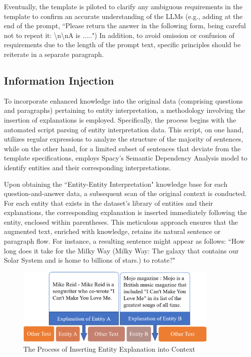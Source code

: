Eventually, the template is piloted to clarify any ambiguous requirements in the template to confirm an accurate understanding of the LLMs (e.g., adding at the end of the prompt, ``Please return the answer in the following form, being careful not to repeat it: \textbackslash n\textbackslash nA is .....")  In addition, to avoid omission or confusion of requirements due to the length of the prompt text, specific principles should be reiterate in a separate paragraph.

\subsection{Information Injection}

To incorporate enhanced knowledge into the original data (comprising questions and paragraphs) pertaining to entity interpretation, a methodology involving the insertion of explanations is employed. Specifically, the process begins with the automated script parsing of entity interpretation data. This script, on one hand, utilizes regular expressions to analyze the structure of the majority of sentences, while on the other hand, for a limited subset of sentences that deviate from the template specifications, employs Spacy's Semantic Dependency Analysis model to identify entities and their corresponding interpretations.

Upon obtaining the ``Entity-Entity Interpretation" knowledge base for each question-and-answer data, a subsequent scan of the original context is conducted. For each entity that exists in the dataset's library of entities and their explanations, the corresponding explanation is inserted immediately following the entity, enclosed within parentheses. This meticulous approach ensures that the augmented text, enriched with knowledge, retains its natural sentence or paragraph flow. For instance, a resulting sentence might appear as follows: ``How long does it take for the Milky Way (Milky Way: The galaxy that contains our Solar System and is home to billions of stars.) to rotate?" 

\label{sec:information_injection}
\begin{figure}[h]
	\centering
	\includegraphics[width=10cm]{EntityInsert.png}
	\caption{The Process of Inserting Entity Explanation into Context}
	\label{fig:entity_insertion}
\end{figure}

